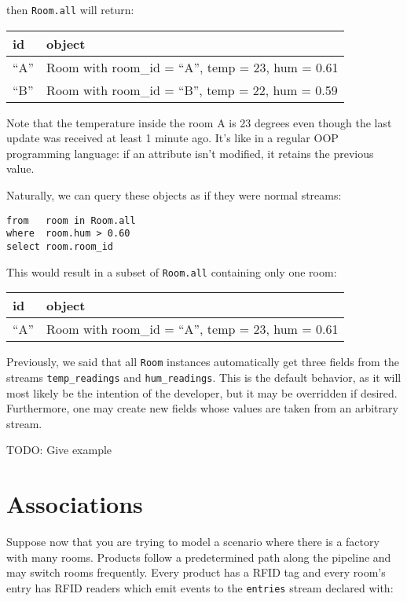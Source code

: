 \documentclass{report}
\begin{document}
then \verb=Room.all= will return:

\begin{tabular}{ |l|l| }
  \hline
  id & object \\
  \hline
  ``A'' & Room with room\_id = ``A'', temp = 23, hum = 0.61 \\
  ``B'' & Room with room\_id = ``B'', temp = 22, hum = 0.59 \\
  \hline
\end{tabular}

Note that the temperature inside the room A is 23 degrees even though
the last update was received at least 1 minute ago. It's like in a
regular OOP programming language: if an attribute isn't modified, it
retains the previous value.

Naturally, we can query these objects as if they were normal streams:

\begin{verbatim}
from   room in Room.all
where  room.hum > 0.60
select room.room_id
\end{verbatim}

This would result in a subset of \verb=Room.all= containing only one
room:

\begin{tabular}{ |l|l| }
  \hline
  id & object \\
  \hline
  ``A'' & Room with room\_id = ``A'', temp = 23, hum = 0.61 \\
  \hline
\end{tabular}

Previously, we said that all \verb=Room= instances automatically get
three fields from the streams \verb=temp_readings= and
\verb=hum_readings=. This is the default behavior, as it will most
likely be the intention of the developer, but it may be overridden if
desired. Furthermore, one may create new fields whose values are taken
from an arbitrary stream.

TODO: Give example

\section{Associations}
\label{sec:associations}

Suppose now that you are trying to model a scenario where there is a
factory with many rooms. Products follow a predetermined path along
the pipeline and may switch rooms frequently. Every product has a
RFID tag and every room's entry has RFID readers which emit events to
the \verb=entries= stream declared with:
\end{document}
